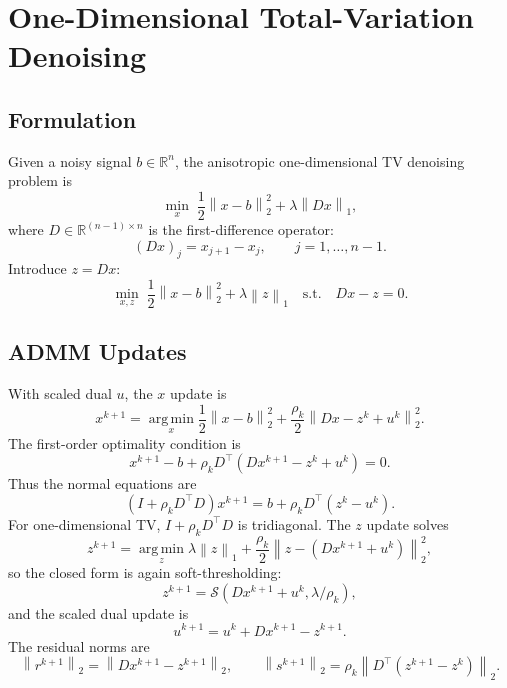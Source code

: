 \documentclass[11pt]{article}
\newcommand{\R}{\mathbb{R}}
\newcommand{\argmin}{\operatorname*{arg\,min}}
\newcommand{\shrink}{\mathcal{S}}
\newcommand{\norm}[1]{\left\lVert #1 \right\rVert}
\begin{document}
\section{One-Dimensional Total-Variation Denoising}

\subsection{Formulation}

Given a noisy signal $b\in\R^n$, the anisotropic one-dimensional TV denoising
problem is
\begin{equation}
    \min_x\;
    \frac{1}{2}\norm{x-b}_2^2
    +\lambda\norm{Dx}_1,
    \label{eq:tv}
\end{equation}
where $D\in\R^{(n-1)\times n}$ is the first-difference operator:
\begin{equation}
    (Dx)_j=x_{j+1}-x_j,\qquad j=1,\ldots,n-1.
\end{equation}
Introduce $z=Dx$:
\begin{equation}
    \min_{x,z}\;
    \frac{1}{2}\norm{x-b}_2^2+\lambda\norm{z}_1
    \quad \text{s.t.}\quad
    Dx-z=0.
\end{equation}

\subsection{ADMM Updates}

With scaled dual $u$, the $x$ update is
\begin{equation}
    x^{k+1}
    =
    \argmin_x
    \frac{1}{2}\norm{x-b}_2^2
    +
    \frac{\rho_k}{2}\norm{Dx-z^k+u^k}_2^2.
\end{equation}
The first-order optimality condition is
\begin{equation}
    x^{k+1}-b
    +
    \rho_k D^\top(Dx^{k+1}-z^k+u^k)=0.
\end{equation}
Thus the normal equations are
\begin{equation}
    (I+\rho_k D^\top D)x^{k+1}
    =
    b+\rho_k D^\top(z^k-u^k).
    \label{eq:tv-x-update}
\end{equation}
For one-dimensional TV, $I+\rho_kD^\top D$ is tridiagonal.  The $z$ update
solves
\begin{equation}
    z^{k+1}
    =
    \argmin_z
    \lambda\norm{z}_1
    +
    \frac{\rho_k}{2}\norm{z-(Dx^{k+1}+u^k)}_2^2,
\end{equation}
so the closed form is again soft-thresholding:
\begin{equation}
    z^{k+1}
    =
    \shrink(Dx^{k+1}+u^k,\lambda/\rho_k),
    \label{eq:tv-z-update}
\end{equation}
and the scaled dual update is
\begin{equation}
    u^{k+1}=u^k+Dx^{k+1}-z^{k+1}.
\end{equation}
The residual norms are
\begin{equation}
    \norm{r^{k+1}}_2=\norm{Dx^{k+1}-z^{k+1}}_2,
    \qquad
    \norm{s^{k+1}}_2
    =
    \rho_k\norm{D^\top(z^{k+1}-z^k)}_2.
\end{equation}
\end{document}
